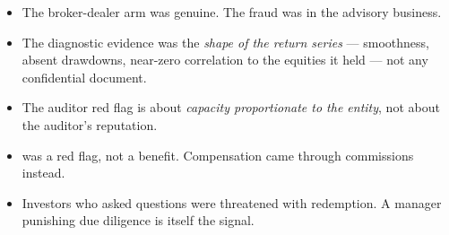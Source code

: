 \begin{imtrapbox}[title={Consolidated trap summary --- IM-14}]
\begin{itemize}
\item {} The broker-dealer arm was genuine. The fraud was in
the advisory business.
\item {} The diagnostic evidence was the \emph{shape of
the return series} --- smoothness, absent drawdowns, near-zero correlation to the
equities it held --- not any confidential document.
\item {} The auditor red flag is about \emph{capacity
proportionate to the entity}, not about the auditor's reputation.
\item {}  was a red flag, not a benefit.
Compensation came through commissions instead.
\item {} Investors who asked questions were threatened with
redemption. A manager punishing due diligence is itself the signal.
\end{itemize}
\end{imtrapbox}

